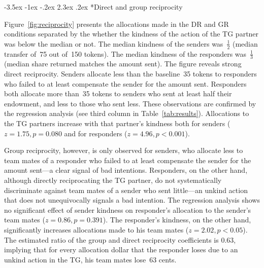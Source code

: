 \documentclass[12pt,a4paper]{article}
\makeatletter
\renewcommand\subsection{\@startsection {subsection}{1}{\z@}%
{-3.5ex \@plus -1ex \@minus -.2ex}%
{2.3ex \@plus.2ex}%
{\it\large}}
\makeatother
\begin{document}
\subsection*{Direct and group reciprocity}
\label{sec:reciprocity}

Figure~\ref{fig:reciprocity} presents the allocations made in the
DR and GR conditions separated by the whether the kindness of the
action of the TG partner was below the median or not. The median kindness
of the senders was~$\frac{1}{2}$ (median transfer of~75 out of~150
tokens). The median kindness of the responders was~$\frac{1}{3}$
(median share returned matches the amount sent). The figure reveals
strong direct reciprocity. Senders allocate less than the baseline~35
tokens to responders who failed to at least compensate the sender
for the amount sent. Responders both allocate more than~35 tokens
to senders who sent at least half their endowment, and less to those
who sent less. These observations are confirmed by the regression
analysis (see third column in Table~\ref{tab:results}). Allocations
to the TG partners increase with that partner's kindness both for
senders ($z=1.75,p=0.080$ and for responders ($z=4.96,p<0.001$).

Group reciprocity, however, is only observed for senders, who allocate
less to team mates of a responder who failed to at least compensate
the sender for the amount sent---a clear signal of bad intentions.
Responders, on the other hand, although directly reciprocating the
TG partner, do not systematically discriminate against team mates
of a sender who sent little---an unkind action that does not unequivocally
signals a bad intention. The regression analysis shows no significant
effect of sender kindness on responder's allocation to the sender's
team mates ($z=0.86,p=0.391$). The responder's kindness, on the other
hand, significantly increases allocations made to his team mates ($z=2.02,p<0.05$).
The estimated ratio of the group and direct reciprocity coefficients
is 0.63, implying that for every allocation dollar that the responder
loses due to an unkind action in the TG, his team mates lose~63 cents.
\end{document}
